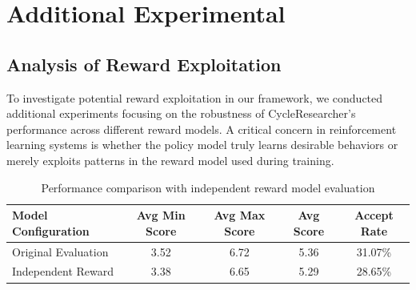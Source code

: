 \documentclass{article} %
\begin{document}
\begin{table}[h]
\centering
\caption{Models. Description of the models evaluated in this effort.}
\vspace{0.3cm}
\label{tab:models}

\end{table}

\section{Additional Experimental}

\subsection{Analysis of Reward Exploitation}

To investigate potential reward exploitation in our framework, we conducted additional experiments focusing on the robustness of CycleResearcher's performance across different reward models. A critical concern in reinforcement learning systems is whether the policy model truly learns desirable behaviors or merely exploits patterns in the reward model used during training.

\begin{table}[h]
\centering
\caption{Performance comparison with independent reward model evaluation}
\label{tab:reward_exploit}
\begin{tabular}{l|cccc}
\toprule
Model Configuration & Avg Min Score & Avg Max Score & Avg Score & Accept Rate \\
\midrule
Original Evaluation & 3.52 & 6.72 & 5.36 & 31.07\% \\
Independent Reward & 3.38 & 6.65 & 5.29 & 28.65\% \\
\bottomrule
\end{tabular}
\end{table}
\end{document}

